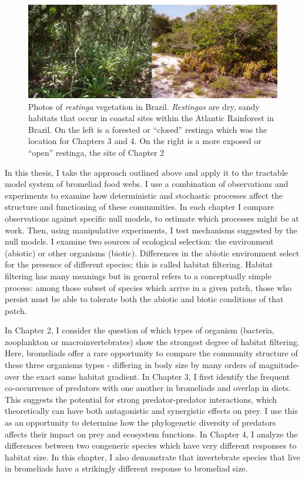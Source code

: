 \begin{figure}[htbp]
\centering
\includegraphics[width=5.5in]{figures/restinga2.pdf}
\caption[Photos of \emph{restinga} vegetation in Brazil]{Photos of \emph{restinga} vegetation in Brazil. \emph{Restingas} are dry, sandy habitats that occur in coastal sites within the Atlantic Rainforest in Brazil. On the left is a forested or ``closed'' restinga which was the location for Chapters 3 and 4. On the right is a more exposed or ``open'' restinga, the site of Chapter 2}
\label{fig:phylo_niche_overlap}
\end{figure}


In this thesis, I take the approach outlined above and apply it to the
tractable model system of bromeliad food webs. I use a combination of
observations and experiments to examine how deterministic and stochastic
processes affect the structure and functioning of these communities. In
each chapter I compare observations against specific null models, to
estimate which processes might be at work. Then, using manipulative
experiments, I test mechanisms suggested by the null models. I examine
two sources of ecological selection: the environment (abiotic) or other
organisms (biotic). Differences in the abiotic environment select for
the presence of different species; this is called habitat filtering.
Habitat filtering has many meanings \citep{Southwood1977, Kraft2015} but
in general refers to a conceptually simple process: among those subset
of species which arrive in a given patch, those who persist must be able
to tolerate both the abiotic and biotic conditions of that patch.

In Chapter 2, I consider the question of which types of organism
(bacteria, zooplankton or macroinvertebrates) show the strongest degree
of habitat filtering. Here, bromeliads offer a rare opportunity to
compare the community structure of these three organisms types -
differing in body size by many orders of magnitude- over the exact same
habitat gradient. In Chapter 3, I first identify the frequent
co-occurrence of predators with one another in bromeliads and overlap in
diets. This suggests the potential for strong predator-predator
interactions, which theoretically can have both antagonistic and
synergistic effects on prey. I use this as an opportunity to determine
how the phylogenetic diversity of predators affects their impact on prey
and ecosystem functions. In Chapter 4, I analyze the differences between
two congeneric species which have very different responses to habitat
size. In this chapter, I also demonstrate that invertebrate species that
live in bromeliads have a strikingly different response to bromeliad
size.

